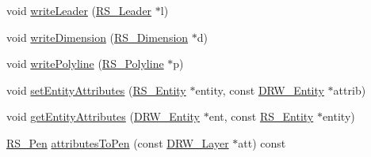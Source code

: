 \begin{DoxyCompactItemize}
\item 
void \hyperlink{classRS__FilterDXFRW_af43470b170c6a4f6b5d79baeb3a5c097}{write\-Leader} (\hyperlink{classRS__Leader}{R\-S\-\_\-\-Leader} $\ast$l)
\item 
void \hyperlink{classRS__FilterDXFRW_a8598d44e3d0b03652886666b72b02257}{write\-Dimension} (\hyperlink{classRS__Dimension}{R\-S\-\_\-\-Dimension} $\ast$d)
\item 
void \hyperlink{classRS__FilterDXFRW_ab678c181a8724eff0d5b118dcec10839}{write\-Polyline} (\hyperlink{classRS__Polyline}{R\-S\-\_\-\-Polyline} $\ast$p)
\item 
void \hyperlink{classRS__FilterDXFRW_a550ddb2d5868f3c2cceff0f4c0d37692}{set\-Entity\-Attributes} (\hyperlink{classRS__Entity}{R\-S\-\_\-\-Entity} $\ast$entity, const \hyperlink{classDRW__Entity}{D\-R\-W\-\_\-\-Entity} $\ast$attrib)
\item 
void \hyperlink{classRS__FilterDXFRW_aee1b0cfd526c0fcde2b1d285a973e014}{get\-Entity\-Attributes} (\hyperlink{classDRW__Entity}{D\-R\-W\-\_\-\-Entity} $\ast$ent, const \hyperlink{classRS__Entity}{R\-S\-\_\-\-Entity} $\ast$entity)
\item 
\hyperlink{classRS__Pen}{R\-S\-\_\-\-Pen} \hyperlink{classRS__FilterDXFRW_aa1ad5052709275340e96773cc3d859e7}{attributes\-To\-Pen} (const \hyperlink{classDRW__Layer}{D\-R\-W\-\_\-\-Layer} $\ast$att) const 
\end{DoxyCompactItemize}

